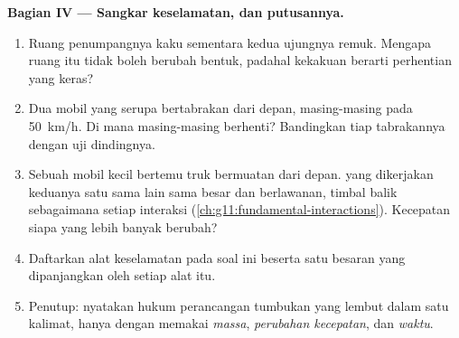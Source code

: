\begin{problem}
\medskip
\noindent\textbf{Bagian IV --- Sangkar keselamatan, dan putusannya.}
\begin{enumerate}[resume]
  \item Ruang penumpangnya kaku sementara kedua ujungnya remuk. Mengapa
        ruang itu tidak boleh berubah bentuk, padahal kekakuan berarti
        perhentian yang keras?
  \item Dua mobil yang serupa bertabrakan dari depan, masing-masing
        pada \qty{50}{km/h}. Di mana masing-masing berhenti? Bandingkan
        tiap tabrakannya dengan uji dindingnya.
  \item Sebuah mobil kecil bertemu truk bermuatan dari depan.  yang
        dikerjakan keduanya satu sama lain sama besar dan berlawanan,
        timbal balik sebagaimana setiap interaksi
        (\cref{ch:g11:fundamental-interactions}). Kecepatan siapa yang
        lebih banyak berubah?
  \item Daftarkan alat keselamatan pada soal ini beserta satu besaran
        yang dipanjangkan oleh setiap alat itu.
  \item Penutup: nyatakan hukum perancangan tumbukan yang lembut dalam
        satu kalimat, hanya dengan memakai \emph{massa}, \emph{perubahan
        kecepatan}, \emph{} dan \emph{waktu}.
\end{enumerate}
\end{problem}
